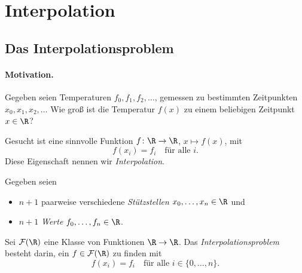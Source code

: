 \documentclass[11pt]{article}
\begin{document}

\tableofcontents
\newpage

\section{Interpolation}

\subsection{Das Interpolationsproblem}

\paragraph{Motivation.}
Gegeben seien Temperaturen $f_0, f_1, f_2, \dots$, gemessen zu bestimmten Zeitpunkten $x_0, x_1, x_2, \dots$
Wie groß ist die Temperatur $f(x)$ zu einem beliebigen Zeitpunkt $x \in \R$?

\begin{center}
\end{center}


Gesucht ist eine \glqq sinnvolle\grqq{} Funktion $f\colon \R \to \R$, $x \mapsto f(x)$, mit
\[ f(x_i) = f_i \quad \text{für alle } i. \]
Diese Eigenschaft nennen wir \textit{Interpolation}.

\begin{definition}[Interpolationsproblem]\Theorem
  Gegeben seien
  \begin{itemize}
    \item $n+1$ paarweise verschiedene \emph{Stützstellen} $x_0, \dots, x_n \in \R$ und
    \item $n+1$ \emph{Werte} $f_0, \dots, f_n \in \R$.
  \end{itemize}
  Sei $\mathcal{F}(\R)$ eine Klasse von Funktionen $\R \to \R$.
  Das \emph{Interpolationsproblem} besteht darin, ein $f \in \mathcal{F}(\R)$ zu finden mit
  \[ f(x_i) = f_i \quad \text{für alle } i \in \{0, \dots, n\}. \]
\end{definition}
\end{document}
